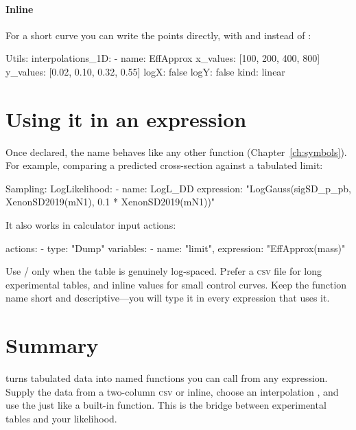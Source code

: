 \paragraph{Inline}

For a short curve you can write the points directly, with  and
 instead of :

\begin{yamlwin}
Utils:
  interpolations_1D:
    - name: EffApprox
      x_values: [100, 200, 400, 800]
      y_values: [0.02, 0.10, 0.32, 0.55]
      logX: false
      logY: false
      kind: linear
\end{yamlwin}

\section{Using it in an expression}
\label{sec:utils-use}

Once declared, the name behaves like any other function (Chapter~\ref{ch:symbols}). For example,
comparing a predicted cross-section against a tabulated limit:

\begin{yamlwin}
Sampling:
  LogLikelihood:
    - name: LogL_DD
      expression: "LogGauss(sigSD_p_pb, XenonSD2019(mN1), 0.1 * XenonSD2019(mN1))"
\end{yamlwin}

\noindent It also works in calculator input actions:

\begin{yamlwin}
actions:
  - type: "Dump"
    variables:
      - {name: "limit", expression: "EffApprox(mass)"}
\end{yamlwin}

\begin{jtip}
Use / only when the table is genuinely log-spaced. Prefer a
\textsc{csv} file for long experimental tables, and inline values for small control curves. Keep
the function name short and descriptive---you will type it in every expression that uses it.
\end{jtip}

\section{Summary}
\label{sec:utils-summary}

 turns tabulated data into named functions you can call from any
expression. Supply the data from a two-column \textsc{csv} or inline, choose an interpolation
, and use the  just like a built-in function. This is the bridge
between experimental tables and your likelihood.
